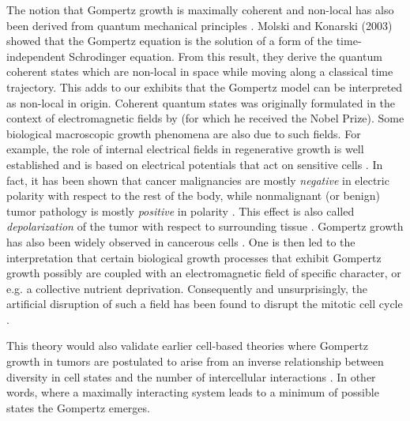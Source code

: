 \documentclass{article}
\begin{document}
The notion that Gompertz growth is maximally coherent and non-local has also been derived from quantum mechanical principles \cite{molski2003coherent}. Molski and Konarski (2003) showed that the Gompertz equation is the solution of a form of the time-independent Schrodinger equation. From this result, they derive the quantum coherent states which are non-local in space while moving along a classical time trajectory. This adds to our exhibits that the Gompertz model can be interpreted as non-local in origin. Coherent quantum states was originally formulated in the context of electromagnetic fields by \citet{glauber1963coherent} (for which he received the Nobel Prize). Some biological macroscopic growth phenomena are also due to such fields. For example, the role of internal electrical fields in regenerative growth is well established \citep{levin2021bioelectric} and is based on electrical potentials that act on sensitive cells \cite{becker1984electromagnetic}. In fact, it has been shown that cancer malignancies are mostly \textit{negative} in electric polarity with respect to the rest of the body, while nonmalignant (or benign) tumor pathology is mostly \textit{positive} in polarity \cite{langman1949technique}. This effect is also called \emph{depolarization} of the tumor with respect to surrounding tissue \citep{chernet2013transmembrane,cervera2020community}. Gompertz growth has also been widely observed in cancerous cells \cite{kozusko2003combining,laird1964dynamics}. One is then led to the interpretation that certain biological growth processes that exhibit Gompertz growth possibly are coupled with an electromagnetic field of specific character, or e.g. a collective nutrient deprivation. Consequently and unsurprisingly, the artificial disruption of such a field has been found to disrupt the mitotic cell cycle \cite{goodman1983pulsing,liboff1981alternating,norton1984bioelectric,liboff1984time}. 

This theory would also validate earlier cell-based theories where Gompertz growth in tumors are postulated to arise from an inverse relationship between diversity in cell states and the number of intercellular interactions \cite{kendal1985gompertzian}. In other words, where a maximally interacting system leads to a minimum of possible states the Gompertz emerges. 
\end{document}
